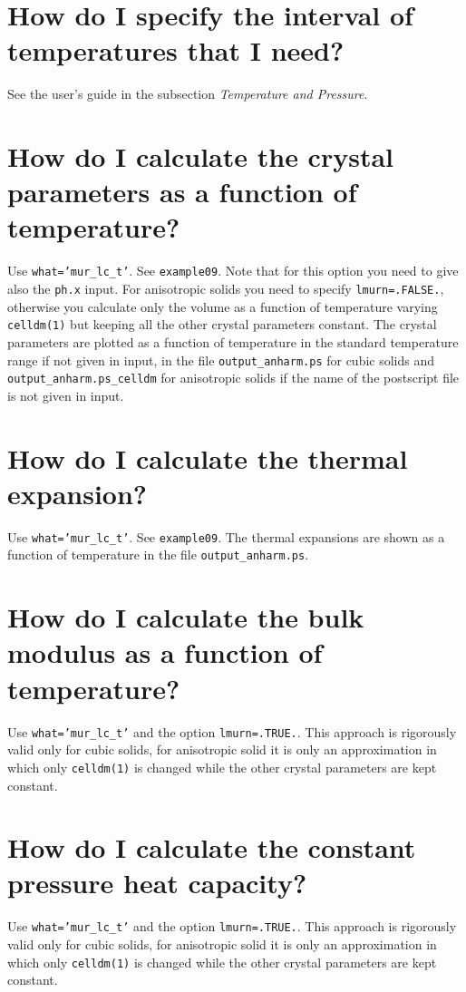 \documentclass[12pt,a4paper]{article}
\begin{document}
\section{\color{coral} How do I specify the interval of temperatures that 
I need?}
See the user's guide in the subsection {\it Temperature and Pressure}.

\section{\color{coral} How do I calculate the crystal parameters as a function
of temperature?}
Use \texttt{what='mur\_lc\_t'}. See \texttt{example09}. Note that
for this option you need to give also the \texttt{ph.x} input.
For anisotropic solids you need to specify \texttt{lmurn=.FALSE.},
otherwise you calculate only the volume as a function of temperature
varying \texttt{celldm(1)} but keeping all the other crystal parameters
constant. The crystal parameters are plotted as a function of temperature
in the standard temperature range if not given in input, in the file 
\texttt{output\_anharm.ps} for cubic solids and
\texttt{output\_anharm.ps\_celldm} for anisotropic
solids if the name of the postscript file is not given in input.

\section{\color{coral} How do I calculate the thermal expansion?}
Use \texttt{what='mur\_lc\_t'}. See \texttt{example09}. The thermal expansions
are shown as a function of temperature in the file \texttt{output\_anharm.ps}.

\section{\color{coral} How do I calculate the bulk modulus as a function of 
temperature?}
Use \texttt{what='mur\_lc\_t'} and the option \texttt{lmurn=.TRUE.}.
This approach is rigorously valid only for cubic solids, for anisotropic
solid it is only an approximation in which only \texttt{celldm(1)} is
changed while the other crystal parameters are kept constant.

\section{\color{coral} How do I calculate the constant pressure heat capacity?}
Use \texttt{what='mur\_lc\_t'} and the option \texttt{lmurn=.TRUE.}.
This approach is rigorously valid only for cubic solids, for anisotropic
solid it is only an approximation in which only \texttt{celldm(1)} is
changed while the other crystal parameters are kept constant.
\end{document}
